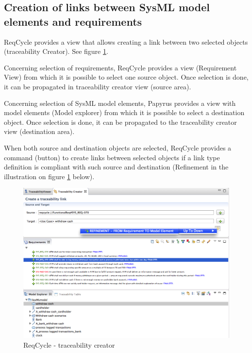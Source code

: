 \documentclass[11pt]{template/openetcs_report}
\begin{document}
\subsection{Creation of links between SysML model elements and requirements}
\label{sec-6-3}
ReqCycle provides a view that allows creating a link between two selected objects (traceability Creator). See figure \ref{fig:trace_second-TraceabilityCreator}.

Concerning selection of requirements, ReqCycle provides a view (Requirement View) from which it is possible to select one source object. Once selection is done, it can be propagated in traceability creator view (source area).

Concerning selection of SysML model elements, Papyrus provides a view with model elements (Model explorer) from which it is possible to select a destination object. Once selection is done, it can be propagated to the traceability creator view (destination area).

When both source and destination objects are selected, ReqCycle provides a command (button) to create links between selected objects if a link type definition is compliant with such source and destination (Refinement in the illustration on figure \ref{fig:trace_second-TraceabilityCreator} below).

\begin{figure}[htbp]
\centering
\includegraphics[width=1.0\linewidth]{images/second_trace_solution_TraceabilityCreator.png}
\caption{\label{fig:trace_second-TraceabilityCreator}ReqCycle - traceability creator}
\end{figure}
\end{document}

